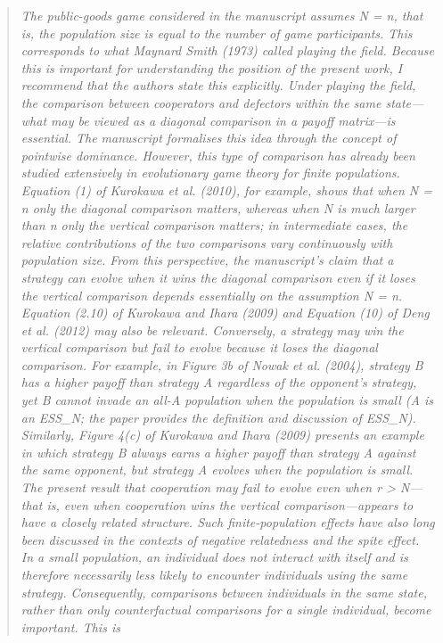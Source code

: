 \documentclass[11pt]{article}
\newenvironment{reviewerquote}
  {\begin{quote}\itshape}
  {\end{quote}}
\begin{document}
\begin{reviewerquote}
  The public-goods game considered in the manuscript assumes N = n, that is, the population size is equal to
  the number of game participants. This corresponds to what Maynard Smith (1973) called playing the field.
  Because this is important for understanding the position of the present work, I recommend that the authors
  state this explicitly.
  Under playing the field, the comparison between cooperators and defectors within the same state—what may
  be viewed as a diagonal comparison in a payoff matrix—is essential. The manuscript formalises this idea
  through the concept of pointwise dominance. However, this type of comparison has already been studied
  extensively in evolutionary game theory for finite populations.
  Equation (1) of Kurokawa et al. (2010), for example, shows that when N = n only the diagonal comparison
  matters, whereas when N is much larger than n only the vertical comparison matters; in intermediate cases,
  the relative contributions of the two comparisons vary continuously with population size. From this
  perspective, the manuscript's claim that a strategy can evolve when it wins the diagonal comparison even if it
  loses the vertical comparison depends essentially on the assumption N = n. Equation (2.10) of Kurokawa and
  Ihara (2009) and Equation (10) of Deng et al. (2012) may also be relevant.
  Conversely, a strategy may win the vertical comparison but fail to evolve because it loses the diagonal
  comparison. For example, in Figure 3b of Nowak et al. (2004), strategy B has a higher payoff than strategy A
  regardless of the opponent's strategy, yet B cannot invade an all-A population when the population is small
  (A is an ESS_N; the paper provides the definition and discussion of ESS_N). Similarly, Figure 4(c) of
  Kurokawa and Ihara (2009) presents an example in which strategy B always earns a higher payoff than
  strategy A against the same opponent, but strategy A evolves when the population is small. The present result
  that cooperation may fail to evolve even when r > N—that is, even when cooperation wins the vertical
  comparison—appears to have a closely related structure.
  Such finite-population effects have also long been discussed in the contexts of negative relatedness and the
  spite effect. In a small population, an individual does not interact with itself and is therefore necessarily less
  likely to encounter individuals using the same strategy. Consequently, comparisons between individuals in
  the same state, rather than only counterfactual comparisons for a single individual, become important. This is

\end{reviewerquote}
\end{document}
